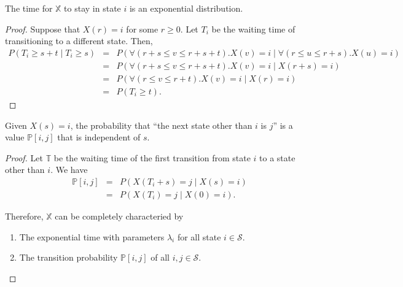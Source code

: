 \begin{observation}
The time for $ \mathbb{X} $ to stay in state $ i $ is an exponential distribution.
\begin{proof}
Suppose that $ X(r) = i $ for some $ r \ge 0 $.
Let $ T_{i} $ be the waiting time of transitioning to a different state. Then,
\begin{eqnarray*}
P(T_{i} \ge s + t \mid T_{i} \ge s)
  & = & P(\forall(r + s \le v \le r + s + t).X(v) = i \mid \forall(r \le u \le r + s).X(u) = i) \\
  & = & P(\forall(r + s \le v \le r + s + t).X(v) = i \mid X(r + s) = i) \\
  & = & P(\forall(r \le v \le r + t).X(v) = i \mid X(r) = i) \\
  & = & P(T_{i} \ge t).
\end{eqnarray*}
\end{proof}
\begin{comment}
\begin{alignat*}{3}
  & P(T_{i} \ge t)
    & \quad=\quad & P(T_{i} \ge s + t \mid T_{i} \ge s) \\
  & & \quad=\quad & \frac{P(T_{i} \ge s + t, T_{i} \ge s)}{P(T_{i} \ge s)} \\
  & & \quad=\quad & \frac{P(T_{i} \ge s + t)}{P(T_{i} \ge s)}, \\
\Rightarrow\quad
  & P(T_{i} \ge s + t)
    & \quad=\quad & P(T_{i} \ge s) \cdot P(T_{i} \ge t).
\end{alignat*}
It is satisfied when $ X $ is exponentially distributed (for $ e^{-\lambda_{i}(s + t)} = e^{-\lambda_{i} s} \cdot e^{-\lambda_{i} t} $).

我們稱這個 exponential distribution 的參數為 $ \lambda_{i} $。
\end{comment}
\end{observation}

\begin{observation}
Given $ X(s) = i $, the probability that ``the next state other than $ i $ is $ j $'' is a value $ \mathbb{P}[i, j] $ that is independent of $ s $.
\begin{proof}
Let $ \mathbb{T} $ be the waiting time of the first transition from state $ i $ to a state other than $ i $. We have
\begin{eqnarray*}
\mathbb{P}[i, j]
  & = & P(X(T_{i} + s) = j \mid X(s) = i) \\
  & = & P(X(T_{i}) = j \mid X(0) = i).
\end{eqnarray*}

Therefore, $ \mathbb{X} $ can be completely characteried by
\begin{enumerate}
  \item The exponential time with parameters $ \lambda_{i} $ for all state $ i \in \mathcal{S} $.
  \item The transition probability $ \mathbb{P}[i, j] $ of all $ i, j \in \mathcal{S} $.
\end{enumerate}
\end{proof}
\end{observation}

